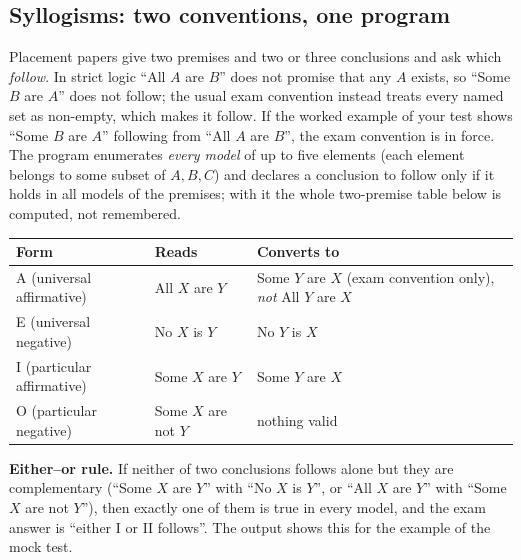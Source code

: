 \documentclass[10pt,a4paper,openany,oneside]{report}
\begin{document}
\subsection{Syllogisms: two conventions, one program}
Placement papers give two premises and two or three conclusions and ask which \emph{follow}. In strict logic ``All $A$ are $B$'' does not promise that any $A$ exists, so ``Some $B$ are $A$'' does not follow; the usual exam convention instead treats every named set as non-empty, which makes it follow. If the worked example of your test shows ``Some $B$ are $A$'' following from ``All $A$ are $B$'', the exam convention is in force. The program enumerates \emph{every model} of up to five elements (each element belongs to some subset of $A,B,C$) and declares a conclusion to follow only if it holds in all models of the premises; with it the whole two-premise table below is computed, not remembered.
\begin{center}\small
\begin{tabular}{@{}lll@{}}
\toprule
\textbf{Form} & \textbf{Reads} & \textbf{Converts to}\\
\midrule
A (universal affirmative) & All $X$ are $Y$ & Some $Y$ are $X$ (exam convention only), \emph{not} All $Y$ are $X$\\
E (universal negative) & No $X$ is $Y$ & No $Y$ is $X$\\
I (particular affirmative) & Some $X$ are $Y$ & Some $Y$ are $X$\\
O (particular negative) & Some $X$ are not $Y$ & nothing valid\\
\bottomrule
\end{tabular}
\end{center}
\textbf{Either--or rule.} If neither of two conclusions follows alone but they are complementary (``Some $X$ are $Y$'' with ``No $X$ is $Y$'', or ``All $X$ are $Y$'' with ``Some $X$ are not $Y$''), then exactly one of them is true in every model, and the exam answer is ``either I or II follows''. The output shows this for the example of the mock test.
\end{document}

